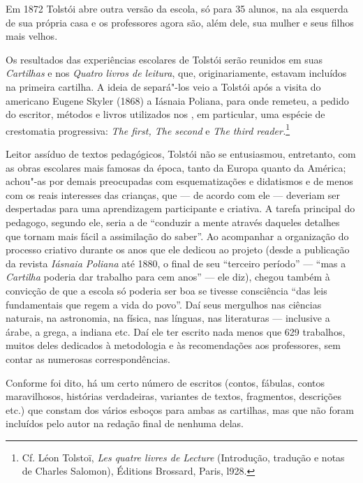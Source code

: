 Em 1872 Tolstói abre outra versão da escola, só para 35 alunos, na ala esquerda de
sua própria casa e os professores agora são, além dele, sua mulher e
seus filhos mais velhos.

Os resultados das experiências escolares de Tolstói serão reunidos em
suas \emph{Cartilhas} e nos \emph{Quatro livros de leitura}, que,
originariamente, estavam incluídos na primeira cartilha. A ideia de
separá"-los veio a Tolstói após a visita do americano Eugene Skyler
(1868) a Iásnaia Poliana, para onde remeteu, a pedido do escritor,
métodos e livros utilizados nos , em particular, uma espécie de
crestomatia progressiva: \emph{The first, The second} e \emph{The third
reader.}\footnote{Cf. Léon Tolstoï, \emph{Les quatre livres de
  Lecture} (Introdução, tradução e notas de Charles Salomon), Éditions
  Brossard, Paris, l928.}

Leitor assíduo de textos pedagógicos, Tolstói não se entusiasmou,
entretanto, com as obras escolares mais famosas da época, tanto da
Europa quanto da América; achou"-as por demais preocupadas com
esquematizações e didatismos e de menos com os reais interesses das
crianças, que --- de acordo com ele --- deveriam ser despertadas para uma
aprendizagem participante e criativa. A tarefa principal do pedagogo,
segundo ele, seria a de ``conduzir a mente através daqueles detalhes que
tornam mais fácil a assimilação do saber''. Ao acompanhar a organização
do processo criativo durante os anos que ele dedicou ao projeto (desde a
publicação da revista \emph{Iásnaia Poliana} até 1880, o final de seu
``terceiro período'' --- ``mas a \emph{Cartilha} poderia dar trabalho para
cem anos'' --- ele diz), chegou também à convicção de que a escola só
poderia ser boa se tivesse consciência ``das leis fundamentais que regem
a vida do povo''. Daí seus mergulhos nas ciências naturais, na
astronomia, na física, nas línguas, nas literaturas --- inclusive a árabe,
a grega, a indiana etc. Daí ele ter escrito nada menos que 629
trabalhos, muitos deles dedicados à metodologia e às recomendações aos
professores, sem contar as numerosas correspondências. 

Conforme foi dito, há um certo número de escritos (contos, fábulas,
contos maravilhosos, histórias verdadeiras, variantes de textos,
fragmentos, descrições etc.) que constam dos vários esboços para ambas
as cartilhas, mas que não foram incluídos pelo autor na redação final de
nenhuma delas.

